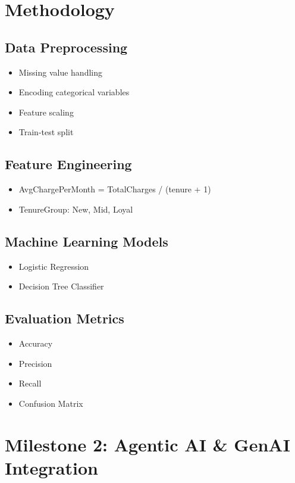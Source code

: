 \documentclass[12pt]{article}
\begin{document}
\section{Methodology}

\subsection{Data Preprocessing}
\begin{itemize}
\item Missing value handling
\item Encoding categorical variables
\item Feature scaling
\item Train-test split
\end{itemize}

\subsection{Feature Engineering}
\begin{itemize}
\item AvgChargePerMonth = TotalCharges / (tenure + 1)
\item TenureGroup: New, Mid, Loyal
\end{itemize}

\subsection{Machine Learning Models}
\begin{itemize}
\item Logistic Regression
\item Decision Tree Classifier
\end{itemize}

\subsection{Evaluation Metrics}
\begin{itemize}
\item Accuracy
\item Precision
\item Recall
\item Confusion Matrix
\end{itemize}

\section{Milestone 2: Agentic AI \& GenAI Integration}
\end{document}
